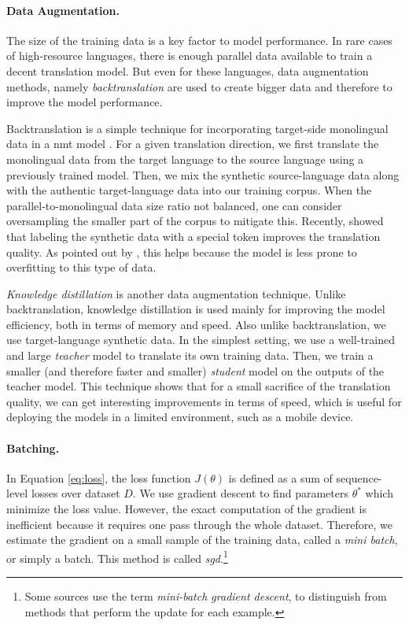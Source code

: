 \paragraph{Data Augmentation.} The size of the training data is a key factor to
model performance. In rare cases of high-resource languages, there is enough
parallel data available to train a decent translation model. But even for these
languages, data augmentation methods, namely \emph{backtranslation} are used
to create bigger data and therefore to improve the model performance.

Backtranslation is a simple technique for incorporating target-side monolingual
data in a \ac{nmt} model \citep{sennrich-etal-2016-improving}. For a given
translation direction, we first translate the monolingual data from the target
language to the source language using a previously trained model. Then, we mix
the synthetic source-language data along with the authentic target-language
data into our training corpus. When the parallel-to-monolingual data size ratio
not balanced, one can consider oversampling the smaller part of the corpus to
mitigate this. Recently, \citet{caswell-etal-2019-tagged} showed that labeling
the synthetic data with a special token improves the translation quality. As
pointed out by \citet{marie-etal-2020-tagged}, this helps because the model is
less prone to overfitting to this type of data.

\emph{Knowledge distillation} \citep{kim-rush-2016-sequence} is another data
augmentation technique. Unlike backtranslation, knowledge distillation is used
mainly for improving the model efficiency, both in terms of memory and speed.
Also unlike backtranslation, we use target-language synthetic data. In the
simplest setting, we use a well-trained and large \emph{teacher} model to
translate its own training data. Then, we train a smaller (and therefore faster
and smaller) \emph{student} model on the outputs of the teacher model. This
technique shows that for a small sacrifice of the translation quality, we can
get interesting improvements in terms of speed, which is useful for deploying
the models in a limited environment, such as a mobile device.

\paragraph{Batching.} In Equation \ref{eq:loss}, the loss function $J(\theta)$
is defined as a sum of sequence-level losses over dataset $D$. We use gradient
descent to find parameters $\theta^*$ which minimize the loss value. However, the
exact computation of the gradient is inefficient because it requires one pass
through the whole dataset. Therefore, we estimate the gradient on a small
sample of the training data, called a \emph{mini batch}, or simply a
batch. This method is called \emph{\ac{sgd}}.\footnote{Some sources use the
  term \emph{mini-batch gradient descent}, to distinguish from methods that
  perform the update for each example.}

